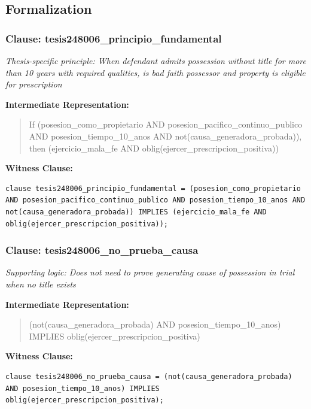 \documentclass[11pt,a4paper]{article}
\begin{document}
\subsection{Formalization}

\subsubsection{Clause: tesis248006\_principio\_fundamental}

\textit{Thesis-specific principle: When defendant admits possession without title for more than 10 years with required qualities, is bad faith possessor and property is eligible for prescription}

\textbf{Intermediate Representation:}

\begin{quote}
If (posesion\_como\_propietario AND posesion\_pacifico\_continuo\_publico AND posesion\_tiempo\_10\_anos AND not(causa\_generadora\_probada)), then (ejercicio\_mala\_fe AND oblig(ejercer\_prescripcion\_positiva))
\end{quote}

\textbf{Witness Clause:}

\begin{lstlisting}[style=witnessstyle, language=Witness]
clause tesis248006_principio_fundamental = (posesion_como_propietario AND posesion_pacifico_continuo_publico AND posesion_tiempo_10_anos AND not(causa_generadora_probada)) IMPLIES (ejercicio_mala_fe AND oblig(ejercer_prescripcion_positiva));
\end{lstlisting}

\subsubsection{Clause: tesis248006\_no\_prueba\_causa}

\textit{Supporting logic: Does not need to prove generating cause of possession in trial when no title exists}

\textbf{Intermediate Representation:}

\begin{quote}
(not(causa\_generadora\_probada) AND posesion\_tiempo\_10\_anos) IMPLIES oblig(ejercer\_prescripcion\_positiva)
\end{quote}

\textbf{Witness Clause:}

\begin{lstlisting}[style=witnessstyle, language=Witness]
clause tesis248006_no_prueba_causa = (not(causa_generadora_probada) AND posesion_tiempo_10_anos) IMPLIES oblig(ejercer_prescripcion_positiva);
\end{lstlisting}
\end{document}
